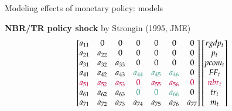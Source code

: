 \documentclass[notes,blackandwhite,mathsans,usenames,dvipsnames]{beamer}
\begin{document}
\begin{frame}{Modeling effects of monetary policy: {\color{purple}models}}

\textbf{NBR/TR policy shock}
{\footnotesize \color{mcxs2}by Strongin (1995, JME)}
\begin{equation*}
\begin{bmatrix} 
a_{11} &0&0&0&0&0&0 \\ 
a_{21} &a_{22}&0&0&0&0&0 \\ 
a_{31} &a_{32}&a_{33}&0&0&0&0 \\ 
a_{41} &a_{42}&a_{43}&\color{mcxs2}a_{44}&\color{mcxs2}a_{45}&\color{mcxs2}a_{46}&0 \\ 
\color{purple}a_{51} &\color{purple}a_{52}&\color{purple}a_{53}&\color{purple}0&\color{purple}a_{55}&\color{purple}a_{56}&\color{purple}0 \\ 
a_{61} &a_{62}&a_{63}&\color{mcxs2}0&\color{mcxs2}0&\color{mcxs2}a_{66}&0 \\ 
a_{71} &a_{72}&a_{73}&a_{74}&a_{75}&a_{76}&a_{77} 
\end{bmatrix}
\begin{bmatrix}   rgdp_t \\   p_t \\   pcom_t \\ FF_t \\ {\color{purple}  nbr_t} \\   tr_t \\   m_t \end{bmatrix}
\end{equation*}
\end{frame}
\end{document}
